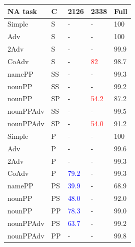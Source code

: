 \begin{center}
\begin{table}[ht]
\centering
\begin{tabular}{|P{2.3cm}|P{0.4cm}||P{0.6cm}|P{0.6cm}|P{0.6cm}|}
\hline
\B NA task & \B C & \B \unit{2}{\textbf{126}} & \B \unit{2}{\textbf{338}} & \B Full \\
\hline
\hline


Simple & S & - &  - &  100 \\

Adv & S & - &  - &  100 \\

2Adv & S & - &  - &  99.9 \\

CoAdv & S & - &  \textcolor{red}{82} &  98.7 \\

namePP & SS & - &  - &  99.3 \\

nounPP & SS & - &  - &  99.2 \\

nounPP & SP &  - &  \textcolor{red}{54.2} &  87.2 \\

nounPPAdv & SS &  - &  - & 99.5 \\

nounPPAdv & SP &  - &  \textcolor{red}{54.0} & 91.2 \\


\hline
Simple & P &  - &  - &  100 \\

Adv & P &  - &  - &  99.6 \\

2Adv & P & - &  - &  99.3 \\

CoAdv & P &  \textcolor{blue}{79.2} &  - &  99.3 \\

namePP & PS & \textcolor{blue}{39.9} &  - &  68.9 \\

nounPP & PS &  \textcolor{blue}{48.0} & - &  92.0 \\

nounPP & PP &  \textcolor{blue}{78.3} & - &  99.0 \\

nounPPAdv & PS & \textcolor{blue}{63.7} &  - &  99.2 \\

nounPPAdv & PP & - &  - &  99.8 \\


\end{tabular}
\end{table}
\end{center}

